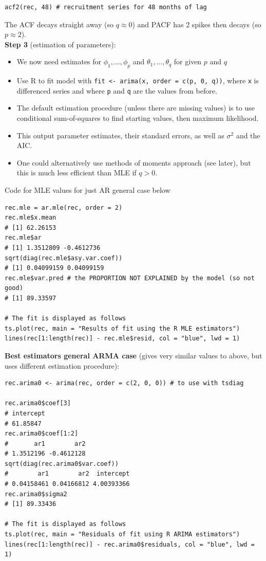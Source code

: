 \documentclass[11pt]{article}
\newcommand{\noi}{\noindent}
\begin{document}
\begin{lstlisting}
acf2(rec, 48) # recruitment series for 48 months of lag
\end{lstlisting}
\noi The ACF decays straight away (so $q \approx 0$) and PACF has 2 spikes then decays (so $p \approx 2$). \\

\noi \textbf{Step 3} (estimation of parameters): \\
\begin{itemize}
    \item We now need estimates for $\phi_1,...,\phi_p$ and $\theta_1,...,\theta_q$ for given $p$ and $q$
    \item Use R to fit model with \texttt{fit <- arima(x, order = c(p, 0, q))}, where \texttt{x} is differenced series and where \texttt{p} and \texttt{q} are the values from before.
    \item The default estimation procedure (unless there are missing values) is to use conditional sum-of-squares to find starting values, then maximum likelihood.
    \item This output parameter estimates, their standard errors, as well as $\sigma^2$ and the AIC.
    \item One could alternatively use methods of moments approach (see later), but this is much less efficient than MLE if $q > 0$.
\end{itemize}
\noi Code for MLE values for just AR general case below
\begin{lstlisting}
rec.mle = ar.mle(rec, order = 2)
rec.mle$x.mean
# [1] 62.26153
rec.mle$ar
# [1] 1.3512809 -0.4612736
sqrt(diag(rec.mle$asy.var.coef))
# [1] 0.04099159 0.04099159
rec.mle$var.pred # the PROPORTION NOT EXPLAINED by the model (so not good)
# [1] 89.33597

# The fit is displayed as follows
ts.plot(rec, main = "Results of fit using the R MLE estimators")
lines(rec[1:length(rec)] - rec.mle$resid, col = "blue", lwd = 1)
\end{lstlisting}

\noi \textbf{Best estimators general ARMA case} (gives very similar values to above, but uses different estimation procedure): \\

\begin{lstlisting}
rec.arima0 <- arima(rec, order = c(2, 0, 0)) # to use with tsdiag

rec.arima0$coef[3]
# intercept 
# 61.85847
rec.arima0$coef[1:2]
#       ar1        ar2
# 1.3512196 -0.4612128
sqrt(diag(rec.arima0$var.coef))
#        ar1        ar2  intercept
# 0.04158461 0.04166812 4.00393366
rec.arima0$sigma2
# [1] 89.33436

# The fit is displayed as follows
ts.plot(rec, main = "Residuals of fit using R ARIMA estimators")
lines(rec[1:length(rec)] - rec.arima0$residuals, col = "blue", lwd = 1)
\end{lstlisting} \phantom{i}
\end{document}
